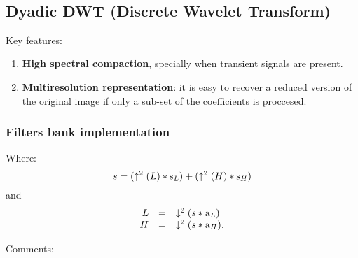     \begin{center}
    \end{center}
    { \hspace*{\fill} \\}
    
    \hypertarget{dyadic-dwt-discrete-wavelet-transform}{%
\subsection{Dyadic DWT (Discrete Wavelet
Transform)}\label{dyadic-dwt-discrete-wavelet-transform}}

Key features:

\begin{enumerate}
\def\labelenumi{\arabic{enumi}.}
\tightlist
\item
  \textbf{High spectral compaction}, specially when transient signals
  are present.
\item
  \textbf{Multiresolution representation}: it is easy to recover a
  reduced version of the original image if only a sub-set of the
  coeﬃcients is proccesed.
\end{enumerate}

    \hypertarget{filters-bank-implementation}{%
\subsubsection{Filters bank
implementation}\label{filters-bank-implementation}}

Where: \begin{equation}
  s = (\uparrow^2(L)*{\text s}_L) + (\uparrow^2(H)*{\text s}_H)
\end{equation} and \begin{equation}
  \begin{array}{rcl}
    L & = & \downarrow^2(s*{\text a}_L) \\
    H & = & \downarrow^2(s*{\text a}_H).
  \end{array}
\end{equation}

Comments:

